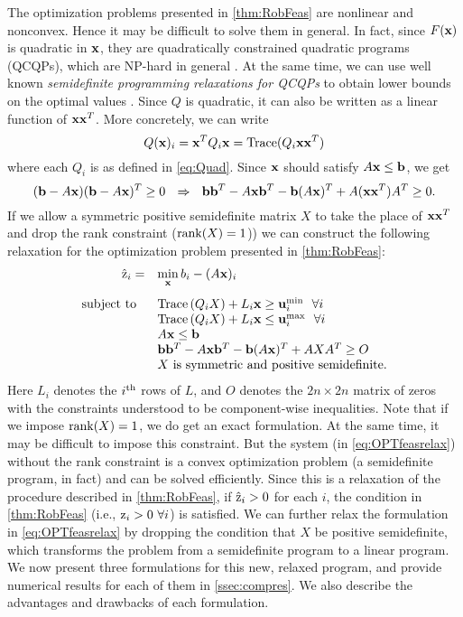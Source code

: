 The optimization problems presented in \cref{thm:RobFeas} are nonlinear and nonconvex.
Hence it may be difficult to solve them in general.
In fact, since $F(\mathbf{x})$ is quadratic in $\mathbf{x}$, they are quadratically constrained quadratic programs (QCQPs), which are NP-hard in general \cite{PaBo2017}.
At the same time, we can use well known \emph{semidefinite programming relaxations for QCQPs} to obtain lower bounds on the optimal values \cite{VaBo1996}.
Since $Q$ is quadratic, it can also be written as a linear function of $\mathbf{x}\mathbf{x}^T$.
More concretely, we can write
$$Q(\mathbf{x})_i=\mathbf{x}^TQ_i\mathbf{x}=\operatorname{Trace}(Q_i\mathbf{x}\mathbf{x}^T)$$
where each $Q_i$ is as defined in \cref{eq:Quad}. 
Since $\mathbf{x}$ should satisfy $A\mathbf{x}\leq \mathbf{b}$, we get
\[
  (\mathbf{b}-A\mathbf{x})(\mathbf{b}-A\mathbf{x})^T \geq 0~~\Rightarrow~~ \mathbf{b}\mathbf{b}^T-A\mathbf{x}\mathbf{b}^T-\mathbf{b}(A\mathbf{x})^T+A(\mathbf{x}\mathbf{x}^T)A^T\geq 0.
\]
If we allow a symmetric positive semidefinite matrix $X$ to take the place of $\mathbf{x}\mathbf{x}^T$ and drop the rank constraint ($\operatorname{rank}(X)=1$)) we can construct the following relaxation for the optimization problem presented in \cref{thm:RobFeas}:
% 
\begin{equation}\label{eq:OPTfeasrelax}
  \begin{array}{rl}
    \hat{\rz}_{i} = & \min\limits_{\vx}  b_i-(A\vx)_i  \\
    \vspace*{-0.05in} \\
    \text{subject to } \ & \Tr\left(Q_iX\right)+ L_i\vx \geq \vu_i^{\min} \ \ \forall i\\
    & \Tr\left(Q_iX\right)+ L_i\vx \leq \vu_i^{\max} \ \ \forall i\\
    &A\vx\leq \vb \\
    &\vb\vb^T-A\vx\vb^T-\vb(A\vx)^T+AXA^T\geq O \\
    &X \text{ is symmetric and positive semidefinite.}
  \end{array}
\end{equation}
%
Here $L_i$ denotes the $i^{\rm th}$ rows of $L$, and $O$ denotes the $2n \times 2n$ matrix of zeros with the constraints understood to be component-wise inequalities.
Note that if we impose $\operatorname{rank}(X)=1$, we do get an exact formulation.
At the same time, it may be difficult to impose this constraint.
But the system (in \cref{eq:OPTfeasrelax}) without the rank constraint is a convex optimization problem (a semidefinite program, in fact) and can be solved efficiently. 
Since this is a relaxation of the procedure described in \cref{thm:RobFeas}, if $\hat{\mathrm{z}}_i>0$ for each $i$, the condition in \cref{thm:RobFeas} (i.e., $\mathrm{z}_i>0 \ \forall i$) is satisfied. 
We can further relax the formulation in \cref{eq:OPTfeasrelax} by dropping the condition that $X$ be positive semidefinite, which transforms the problem from a semidefinite program to a linear program. 
We now present three formulations for this new, relaxed program, and provide numerical results for each of them in \cref{ssec:compres}.
We also describe the advantages and drawbacks of each formulation.


